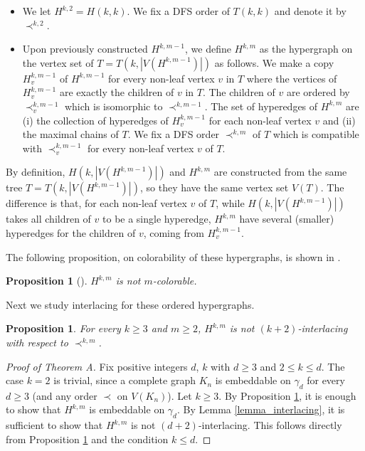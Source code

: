 \documentclass{article}
\newtheorem{prop}[thm]{Proposition}
\theoremstyle{definition}
\begin{document}
\begin{itemize}
	\item We let $H^{k,2}=H(k,k)$. We fix a DFS order of $T(k,k)$ and denote it by $\prec^{k,2}$.
	
	\item Upon previously constructed $H^{k,m-1}$, we define $H^{k,m}$ as the hypergraph on the vertex set of $T=T(k, |V(H^{k,m-1})|)$ as follows. We make a copy $H^{k,m-1}_v$ of $H^{k,m-1}$ for every non-leaf vertex $v$ in $T$ where the vertices of $H^{k,m-1}_v$ are exactly the children of $v$ in $T$. The children of $v$ are ordered by $\prec^{k,m-1}_v$ which is isomorphic to $\prec^{k,m-1}$. The set of hyperedges of $H^{k,m}$ are (i) the collection of hyperedges of $H^{k,m-1}_v$ for each non-leaf vertex $v$ and (ii) the maximal chains of 
    $T$. We fix a DFS order $\prec^{k,m}$ of $T$ which is compatible with $\prec^{k,m-1}_v$ for every non-leaf vertex $v$ of $T$.
\end{itemize}

By definition, $H(k, |V(H^{k,m-1})|)$ and $H^{k,m}$ are constructed from the same tree $T=T(k, |V(H^{k,m-1})|)$, so they have the same vertex set $V(T)$. The difference is that, for each non-leaf vertex $v$ of $T$, while $H(k,|V(H^{k,m-1})|)$ takes all children of $v$ to be a single hyperedge, $H^{k,m}$ have several (smaller) hyperedges for the children of $v$, coming from $H^{k,m-1}_v$.

\medskip 

The following proposition, on colorability of these hypergraphs, is shown in \cite{ABAB_stabbed_pseudodisk}.

\begin{prop}[{\cite[Proposition 3.1]{ABAB_stabbed_pseudodisk}}] \label{prop_not-colorable}
	$H^{k,m}$ is not $m$-colorable.
\end{prop}


Next we study interlacing for these ordered hypergraphs. 
\begin{prop} \label{prop_ABABA-free}
For every $k\geq 3$ and $m\geq 2$,  
 $H^{k,m}$ is not $(k+2)$-interlacing with respect to $\prec^{k,m}$.
\end{prop}

\begin{proof}[Proof of Theorem A]
	Fix positive integers $d$, $k$ with $d\geq 3$ and $2 \leq k\leq d$. 
 The case $k=2$ is trivial, since a complete graph $K_n$ is embeddable on $\gamma_d$ for every $d\geq 3$ (and any order $\prec$ on $V(K_n)$). Let $k\geq 3$. 
 By Proposition \ref{prop_not-colorable}, it is enough to show that $H^{k,m}$ is embeddable on $\gamma_d$. By Lemma \ref{lemma_interlacing}, it is sufficient to show that $H^{k,m}$ is not $(d+2)$-interlacing. This follows directly from Proposition \ref{prop_ABABA-free} and the condition $k\leq d$.
\end{proof}
\end{document}
